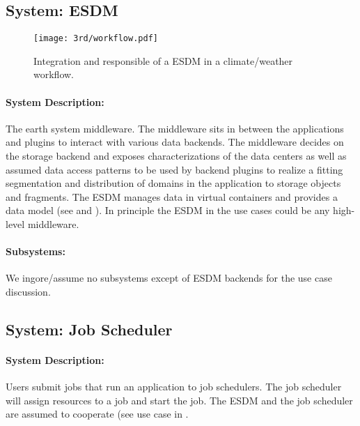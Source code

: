 \subsection{System: ESDM}
\label{System: ESDM}

\begin{figure}
	\centering
	\texttt{[image: 3rd/workflow.pdf]}
	\caption{Integration and responsible of a ESDM in a climate/weather workflow.}
	\label{fig:system esdm}
\end{figure}


\paragraph{System Description:}
The earth system middleware.
The middleware sits in between the applications and plugins to interact with various data backends.
The middleware decides on the storage backend and exposes characterizations of the data centers as well as assumed data access patterns to be used by backend plugins to realize a fitting segmentation and distribution of domains in the application to storage objects and fragments.
The ESDM manages data in virtual containers and provides a data model (see  and ).
In principle the ESDM in the use cases could be any high-level middleware.


\paragraph{Subsystems:}
We ingore/assume no subsystems except of ESDM backends for the use case discussion.







\subsection{System: Job Scheduler}
\label{System: Job Scheduler}

\paragraph{System Description:}
Users submit jobs that run an application to  job schedulers.
The job scheduler will assign resources to a job and start the job.
The ESDM and the job scheduler are assumed to cooperate (see use case in .

